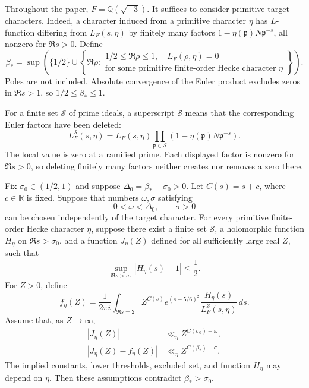Throughout the paper, $F=\mathbb Q(\sqrt{-3})$. It suffices to consider
primitive target characters. Indeed, a character induced from a primitive
character $\eta$ has $L$-function differing from $L_F(s,\eta)$ by finitely
many factors $1-\eta(\mathfrak p)N\mathfrak p^{-s}$, all nonzero for
$\Re s>0$. Define
\begin{equation}
 \beta_* = \sup\left(\{1/2\}\cup
 \left\{\Re\rho:\begin{array}{l}
  1/2\le\Re\rho\le1,\quad L_F(\rho,\eta)=0\\
  \text{for some primitive finite-order Hecke character }\eta
 \end{array}\right\}\right).
 \label{old-eq:1.1b}
\end{equation}
Poles are not included. Absolute convergence of the Euler product excludes
zeros in $\Re s>1$, so $1/2\le\beta_*\le1$.

For a finite set $\mathcal S$ of prime ideals, a superscript $\mathcal S$
means that the corresponding Euler factors have been deleted:
\[
 L_F^{\mathcal S}(s,\eta)
 =L_F(s,\eta)\prod_{\mathfrak p\in\mathcal S}
       (1-\eta(\mathfrak p)N\mathfrak p^{-s}).
\]
The local value is zero at a ramified prime. Each displayed factor is nonzero
for $\Re s>0$, so deleting finitely many factors neither creates nor removes
a zero there.

\begin{proposition}
\label{lem:continuation-criterion}
Fix $\sigma_0\in(1/2,1)$ and suppose $\Delta_0=\beta_*-\sigma_0>0$.
Let $C(s)=s+c$, where $c\in\mathbb R$ is fixed. Suppose that numbers
$\omega,\sigma$ satisfying
\[
 0<\omega<\Delta_0,\qquad \sigma>0
\]
can be chosen independently of the target character. For every primitive
finite-order Hecke character $\eta$, suppose there exist a finite set
$\mathcal S$, a holomorphic function $H_\eta$ on $\Re s>\sigma_0$, and a
function $J_\eta(Z)$ defined for all sufficiently large real $Z$, such that
\begin{equation}
 \sup_{\Re s>\sigma_0}|H_\eta(s)-1|\le\frac12.
 \label{eq:signal-euler-contract}
\end{equation}
For $Z>0$, define
\begin{equation}
 f_\eta(Z)=\frac1{2\pi i}\int_{\Re s=2}
 Z^{C(s)}e^{(s-5/6)^2}
 \frac{H_\eta(s)}{L_F^{\mathcal S}(s,\eta)}\,ds.
 \label{eq:common-residue}
\end{equation}
Assume that, as $Z\to\infty$,
\begin{align}
 |J_\eta(Z)|&\ll_\eta Z^{C(\sigma_0)+\omega},
       \label{eq:low-probe-contract}\\
 |J_\eta(Z)-f_\eta(Z)|&\ll_\eta Z^{C(\beta_*)-\sigma}.
       \label{eq:high-probe-contract}
\end{align}
The implied constants, lower thresholds, excluded set, and function $H_\eta$
may depend on $\eta$. Then these assumptions contradict $\beta_*>\sigma_0$.
\end{proposition}

